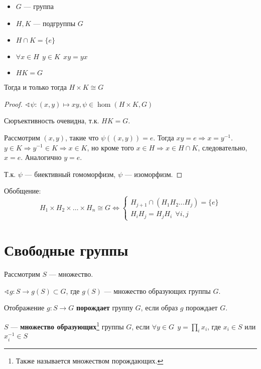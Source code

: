\begin{lemma}\itemfix
    \begin{itemize}
        \item \(G\) --- группа
        \item \(H, K\) --- подгруппы \(G\)
        \item \(H \cap K = \{e\}\)
        \item \(\forall x \in H \ \ y \in K \ \ xy = yx\)
        \item \(HK = G\)
    \end{itemize}

    Тогда и только тогда \(H \times K \cong G\)
\end{lemma}
\begin{proof}
    \(\sphericalangle \psi : (x, y) \mapsto xy, \psi \in \hom(H \times K, G)\)

    Сюръективность очевидна, т.к. \(HK = G\).

    Рассмотрим \((x, y)\), такие что \(\psi((x, y)) = e\). Тогда \(xy = e \Rightarrow x = y^{-1}\). \(y \in K \Rightarrow y^{-1} \in K \Rightarrow x \in K\), но кроме того \(x \in H \Rightarrow x \in H \cap K\), следовательно, \(x = e\). Аналогично \(y = e\).

    Т.к. \(\psi\) --- биективный гомоморфизм, \(\psi\) --- изоморфизм.
\end{proof}

Обобщение:
\[H_1 \times H_2 \times \dots \times H_n \cong G \Leftrightarrow \begin{cases}
        H_{j+1} \cap (H_1 H_2 \dots H_j) = \{e\} \\
        H_i H_j = H_j H_i \ \ \forall i, j
    \end{cases}\]

\section{Свободные группы}

Рассмотрим \(S\) --- множество.

\(\sphericalangle g : S \to g(S) \subset G\), где \(g(S)\) --- множество образующих группы \(G\).

\begin{definition}
    Отображение \(g : S \to G\) \textbf{порождает} группу \(G\), если образ \(g\) порождает \(G\).
\end{definition}

\begin{definition}
    \(S\) --- \textbf{множество образующих}\footnote{Также называется множеством порождающих.} группы \(G\), если \(\forall y \in G \ \ y = \prod_i x_i\), где \(x_i \in S\) или \(x_i^{-1} \in S\)
\end{definition}

